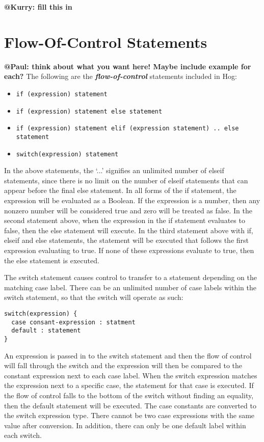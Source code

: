 \documentclass{book}
\begin{document}
\textbf{@Kurry: fill this in}


\section{Flow-Of-Control Statements} %
\label{sec:flow_of_control_statements}

\textbf{@Paul: think about what you want here! Maybe include example for each?} The
following are the \textbf{\emph{flow-of-control}} statements included in Hog:

\begin{itemize}
  \item[] \tt if (expression) statement \rm
  \item[] \tt if (expression) statement else statement \rm
  \item[] \tt if (expression) statement elif (expression statement) .. else 
  statement \rm
  \item[] \tt switch(expression) statement \rm
\end{itemize}

In the above statements, the ‘...’ signifies an unlimited number of elseif
statements, since there is no limit on the number of elseif statements that can
appear before the final else statement. In all forms of the if statement, the
expression will be evaluated as a Boolean. If the expression is a number, then any
non­zero number will be considered true and zero will be treated as false. In the
second statement above, when the expression in the if statement evaluates to false,
then the else statement will execute. In the third statement above with if, elseif
and else statements, the statement will be executed that follows the first
expression evaluating to true. If none of these expressions evaluate to true, then
the else statement is executed.

The switch statement causes control to transfer to a statement depending on the
matching case label. There can be an unlimited number of case labels within the
switch statement, so that the switch will operate as such:

\begin{verbatim}
switch(expression) {
  case consant-expression : statment
  default : statement
}
\end{verbatim}

An expression is passed in to the switch statement and then the flow of control
will fall through the switch and the expression will then be compared to the
constant expression next to each case label. When the switch expression matches the
expression next to a specific case, the statement for that case is executed. If the
flow of control falls to the bottom of the switch without finding an equality, then
the default statement will be executed. The case constants are converted to the
switch expression type. There cannot be two case expressions with the same value
after conversion. In addition, there can only be one default label within each
switch.
\end{document}
